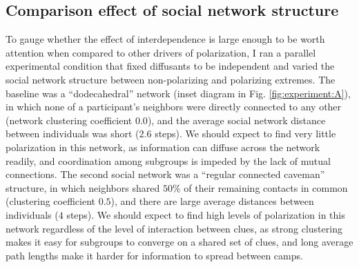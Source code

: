 \documentclass[9pt,twocolumn,twoside,lineno]{pnas-new}
\begin{document}
\subsection*{Comparison effect of social network structure}
To gauge whether the effect of interdependence is large enough to be worth attention when compared to other drivers of polarization, I ran a parallel experimental condition that fixed diffusants to be independent and varied the social network structure between non-polarizing and polarizing extremes. The baseline was a “dodecahedral” network (inset diagram in Fig. \ref{fig:experiment:A}), in which none of a participant’s neighbors were directly connected to any other (network clustering coefficient $0.0$), and the average social network distance between individuals was short ($2.6$ steps). We should expect to find very little polarization in this network, as information can diffuse across the network readily, and coordination among subgroups is impeded by the lack of mutual connections. The second social network was a “regular connected caveman” structure, in which neighbors shared $50\%$ of their remaining contacts in common (clustering coefficient $0.5$), and there are large average distances between individuals ($4$ steps). We should expect to find high levels of polarization in this network regardless of the level of interaction between clues, as strong clustering makes it easy for subgroups to converge on a shared set of clues, and long average path lengths make it harder for information to spread between camps. 
\end{document}
